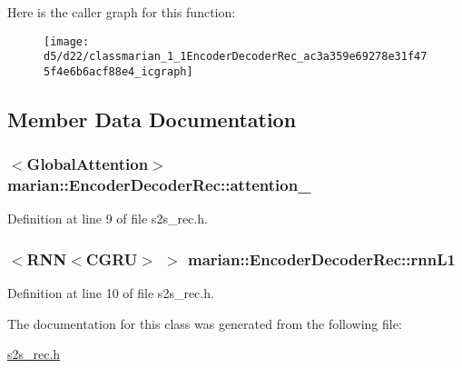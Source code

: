 Here is the caller graph for this function\+:
\nopagebreak
\begin{figure}[H]
\begin{center}
\leavevmode
\texttt{[image: d5/d22/classmarian\_1\_1EncoderDecoderRec\_ac3a359e69278e31f475f4e6b6acf88e4\_icgraph]}
\end{center}
\end{figure}




\subsection{Member Data Documentation}
\subsubsection[{\texorpdfstring{attention\+\_\+}{attention_}}]{$<$Global\+Attention$>$ marian\+::\+Encoder\+Decoder\+Rec\+::attention\+\_\+\hspace{0.3cm}{\ttfamily [private]}}\hypertarget{classmarian_1_1EncoderDecoderRec_ad4768d4a33e83b3fc280f666df286269}{}\label{classmarian_1_1EncoderDecoderRec_ad4768d4a33e83b3fc280f666df286269}


Definition at line 9 of file s2s\+\_\+rec.\+h.

\subsubsection[{\texorpdfstring{rnn\+L1}{rnnL1}}]{$<$R\+NN$<$C\+G\+RU$>$ $>$ marian\+::\+Encoder\+Decoder\+Rec\+::rnn\+L1\hspace{0.3cm}{\ttfamily [private]}}\hypertarget{classmarian_1_1EncoderDecoderRec_ad0d471b436beab644c14a8b692a4d53f}{}\label{classmarian_1_1EncoderDecoderRec_ad0d471b436beab644c14a8b692a4d53f}


Definition at line 10 of file s2s\+\_\+rec.\+h.



The documentation for this class was generated from the following file\+:\begin{DoxyCompactItemize}
\item 
\hyperlink{s2s__rec_8h}{s2s\+\_\+rec.\+h}\end{DoxyCompactItemize}

